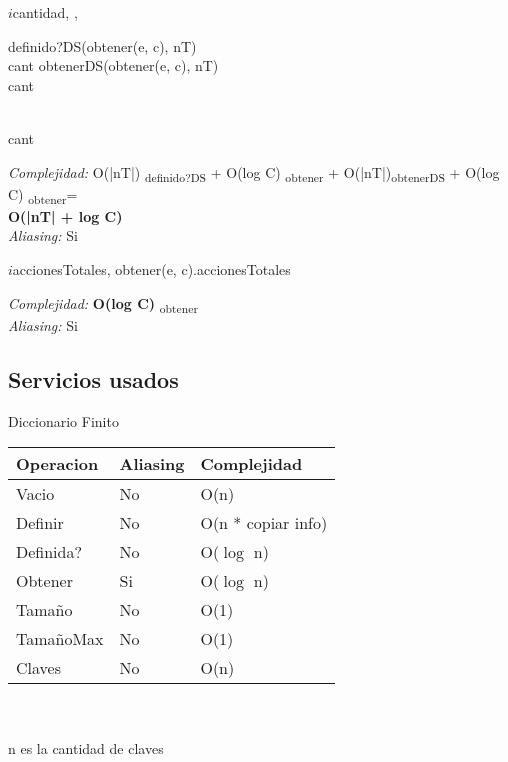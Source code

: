 \begin{algorithm}{$i$cantidad}{, , }{}
			 \\
			\begin{IF}{definido?DS(obtener(e, c), nT)} \\
			cant \leftarrow obtenerDS(obtener(e, c), nT)
		\ELSE \\
			cant 
		\end{IF} \\
		\RETURN cant
			\end{algorithm}	
			\textit{Complejidad:} O(|nT|) \textsubscript{definido?DS}  + O(log C) \textsubscript{obtener} +
			O(|nT|)\textsubscript{obtenerDS}  + O(log C) \textsubscript{obtener}= \\ \textbf{O(|nT| + log C)}\\
	\textit{Aliasing:} Si \\

\begin{algorithm}{$i$accionesTotales}{, }{}
		\RETURN obtener(e, c).accionesTotales
	\end{algorithm}	
		\textit{Complejidad:} \textbf{O(log C)} \textsubscript{obtener} \\		
	\textit{Aliasing:} Si \\

	
\subsection{Servicios usados}

 {\LARGE Diccionario Finito}\\

\begin{tabular}[c]{|l|l|l|}
		\hline
		Operacion & Aliasing & Complejidad \\
		\hline
		Vacio & No & O(n) \\
		\hline
		Definir & No & O(n * copiar info)\\
		\hline
		Definida? & No & O($\log$ n)\\
		\hline
		Obtener & Si & O($\log$ n)\\
		\hline
		Tama\~no & No & O(1)\\
		\hline
		Tama\~noMax & No & O(1)\\
		\hline
		Claves & No & O(n)\\
		\hline
	
	\end{tabular}\\\\
n es la cantidad de claves\\

